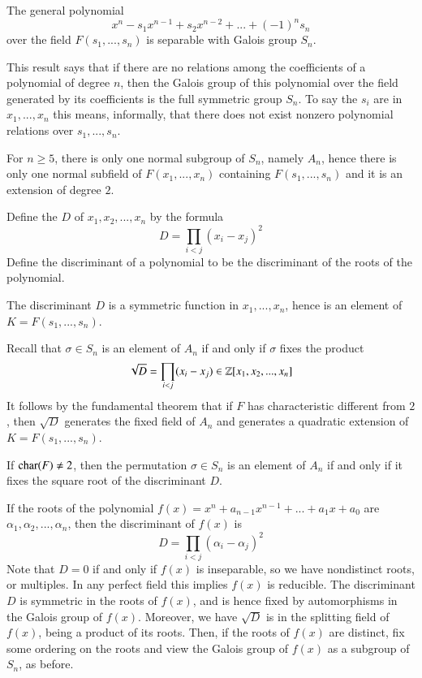 \documentclass[12pt, a4paper, oneside, openright, titlepage]{book}
\begin{document}
\begin{thm}
    The general polynomial \begin{equation*}
        x^n-s_1x^{n-1}+s_2x^{n-2}+...+(-1)^ns_n
    \end{equation*}
    over the field $F(s_1,...,s_n)$ is separable with Galois group $S_n$.
\end{thm}

This result says that if there are no relations among the coefficients of a polynomial of degree $n$, then the Galois group of this polynomial over the field generated by its coefficients is the full symmetric group $S_n$. To say the $s_i$ are  in $x_1,...,x_n$ this means, informally, that there does not exist nonzero polynomial relations over $s_1,...,s_n$.


For $n \geq 5$, there is only one normal subgroup of $S_n$, namely $A_n$, hence there is only one normal subfield of $F(x_1,...,x_n)$ containing $F(s_1,...,s_n)$ and it is an extension of degree $2$. 

\begin{defn}
    Define the  $D$ of $x_1,x_2,...,x_n$ by the formula \begin{equation*}
        D = \prod_{i < j}(x_i-x_j)^2
    \end{equation*}
    Define the discriminant of a polynomial to be the discriminant of the roots of the polynomial.
\end{defn}

The discriminant $D$ is a symmetric function in $x_1,...,x_n$, hence is an element of $K = F(s_1,...,s_n)$.

Recall that $\sigma \in S_n$ is an element of $A_n$ if and only if $\sigma$ fixes the product \begin{equation*}
    \sqrt{D} = \prod_{i<j}(x_i - x_j) \in \mathbb Z[x_1,x_2,...,x_n]
\end{equation*}
It follows by the fundamental theorem that if $F$ has characteristic different from $2$, then $\sqrt{D}$ generates the fixed field of $A_n$ and generates a quadratic extension of $K = F(s_1,...,s_n)$. 

\begin{prop}
    If $\operatorname{char}(F) \neq 2$, then the permutation $\sigma \in S_n$ is an element of $A_n$ if and only if it fixes the square root of the discriminant $D$.
\end{prop}

If the roots of the polynomial $f(x) = x^n + a_{n-1}x^{n-1} + ...+a_1x+ a_0$ are $\alpha_1,\alpha_2,...,\alpha_n$, then the discriminant of $f(x)$ is \begin{equation*}
    D = \prod_{i < j}(\alpha_i - \alpha_j)^2
\end{equation*}
Note that $D = 0$ if and only if $f(x)$ is inseparable, so we have nondistinct roots, or multiples. In any perfect field this implies $f(x)$ is reducible. The discriminant $D$ is symmetric in the roots of $f(x)$, and is hence fixed by automorphisms in the Galois group of $f(x)$. Moreover, we have $\sqrt{D}$ is in the splitting field of $f(x)$, being a product of its roots. Then, if the roots of $f(x)$ are distinct, fix some ordering on the roots and view the Galois group of $f(x)$ as a subgroup of $S_n$, as before.
\end{document}
